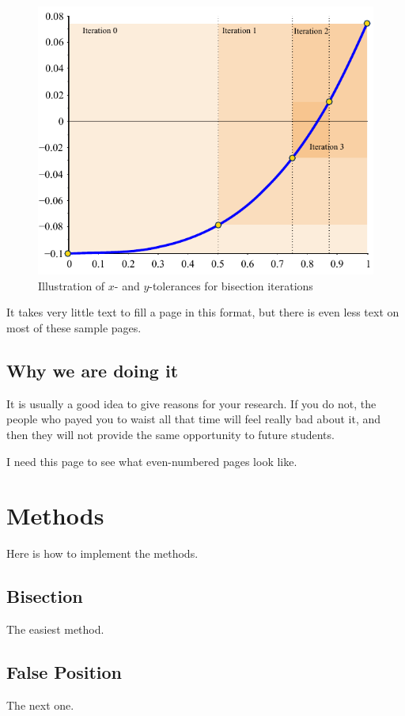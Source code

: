 \documentclass[thesis]{./tex/thesis-umich}
\begin{document}
\begin{figure}
 \begin{center}
  \includegraphics[scale=1]{./pics/f1_tol.pdf}
 \end{center}
 \caption{ \label{fig:fn:tol}
  Illustration of $x$- and $y$-tolerances for bisection iterations}
\end{figure}

\newpage

It takes very little text to fill a page in this format, but there is even less text on most of these sample pages.

\section{Why we are doing it}
It is usually a good idea to give reasons for your research.  If you do not, the people who payed you to waist all that time will feel really bad about it, and then they will not provide the same opportunity to future students.

\newpage

I need this page to see what even-numbered pages look like.

\appendix
\chapter{Methods}
Here is how to implement the methods.

\section{Bisection}
The easiest method.

\section{False Position}
The next one.



\end{document}
